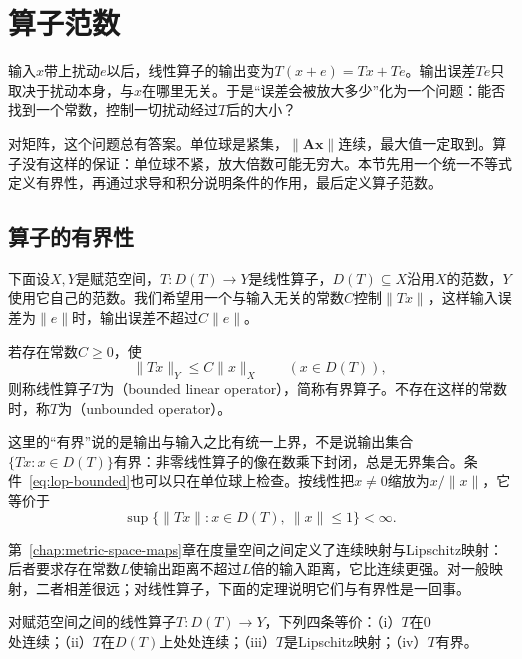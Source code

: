 \section{算子范数}
\label{sec:lop-operator-norm}

输入$x$带上扰动$e$以后，线性算子的输出变为$T(x+e)=Tx+Te$。输出误差$Te$只取决于扰动本身，与$x$在哪里无关。于是“误差会被放大多少”化为一个问题：能否找到一个常数，控制一切扰动经过$T$后的大小？

对矩阵，这个问题总有答案。单位球是紧集，$\lVert\bm A\bm x\rVert$连续，最大值一定取到。算子没有这样的保证：单位球不紧，放大倍数可能无穷大。本节先用一个统一不等式定义有界性，再通过求导和积分说明条件的作用，最后定义算子范数。

\subsection{算子的有界性}
\label{sec:lop-boundedness}

下面设$X,Y$是赋范空间，$T:D(T)\to Y$是线性算子，$D(T)\subseteq X$沿用$X$的范数，$Y$使用它自己的范数。我们希望用一个与输入无关的常数$C$控制$\lVert Tx\rVert$，这样输入误差为$\lVert e\rVert$时，输出误差不超过$C\lVert e\rVert$。

\begin{definition}[有界线性算子]
\label{def:lop-bounded-operator}
若存在常数$C\geq0$，使
\begin{equation}
 \lVert Tx\rVert_Y\leq C\lVert x\rVert_X\qquad(x\in D(T)),
 \label{eq:lop-bounded}
\end{equation}
则称线性算子$T$为（bounded linear operator），简称有界算子。不存在这样的常数时，称$T$为（unbounded operator）。
\end{definition}

这里的“有界”说的是输出与输入之比有统一上界，不是说输出集合$\{Tx:x\in D(T)\}$有界：非零线性算子的像在数乘下封闭，总是无界集合。条件~\eqref{eq:lop-bounded}也可以只在单位球上检查。按线性把$x\neq0$缩放为$x/\lVert x\rVert$，它等价于
\[
 \sup\{\lVert Tx\rVert:x\in D(T),\ \lVert x\rVert\leq1\}<\infty.
\]

第~\ref{chap:metric-space-maps}章在度量空间之间定义了连续映射与Lipschitz映射：后者要求存在常数$L$使输出距离不超过$L$倍的输入距离，它比连续更强。对一般映射，二者相差很远；对线性算子，下面的定理说明它们与有界性是一回事。

\begin{theorem}[有界与连续等价]
\label{thm:lop-bounded-continuous}
对赋范空间之间的线性算子$T:D(T)\to Y$，下列四条等价：（i）$T$在$0$处连续；（ii）$T$在$D(T)$上处处连续；（iii）$T$是Lipschitz映射；（iv）$T$有界。
\end{theorem}


